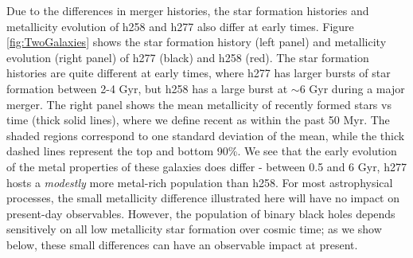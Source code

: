 \documentclass[a4paper,fleqn,usenatbib]{mnras}
\begin{document}
  Due to the differences in merger histories, the star formation histories and metallicity
  evolution of h258 and h277 also differ at early times.  Figure
  \ref{fig:TwoGalaxies} shows the star formation history (left panel) and metallicity evolution (right panel) of h277 (black) and h258 (red).  The star formation histories are quite different at early times, where h277 has larger bursts of star formation between 2-4 Gyr, but h258 has a large burst at $\sim 6$ Gyr during a major merger.   The right panel shows the mean metallicity of
  recently formed stars vs time (thick solid lines), where we define
  recent as within the past 50 Myr.  The shaded regions correspond to
  one standard deviation of the mean, while the thick dashed lines
  represent the top and bottom 90\%.  We see that the early evolution
  of the metal properties of these galaxies does differ - between 0.5
  and 6 Gyr, h277 hosts a \emph{modestly}  more metal-rich population than
  h258.   For most astrophysical processes, the small metallicity difference illustrated here will have no impact on
  present-day observables.  However,  the population of binary black holes  depends sensitively on all low metallicity star formation
  over cosmic time; as we show below, these small differences can have an observable impact at present.   
\end{document}
